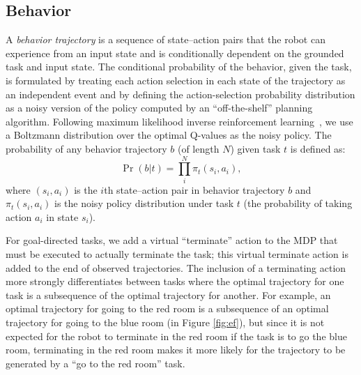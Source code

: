 \documentclass[conference]{IEEEtran}
\begin{document}
\subsection{Behavior}
A \emph{behavior trajectory} is a sequence of state--action pairs that the robot can experience from an input state and is conditionally dependent on the grounded task and input state. The conditional probability of the behavior, given the task, is formulated by treating each action selection in each state of the trajectory as an independent event and by defining the action-selection probability distribution as a noisy version of the policy computed by an ``off-the-shelf'' planning algorithm. Following maximum likelihood inverse reinforcement learning~\cite{babes11}, we use a Boltzmann distribution over the optimal Q-values as the noisy policy. The probability of any behavior trajectory $b$ (of length $N$) given task $t$ is defined as:
\begin{equation}
\label{eq:trajProb}
\Pr(b | t) = \prod^N_i \pi_t(s_i, a_i), 
\end{equation}
where $(s_i, a_i)$ is the $i$th state--action pair in behavior trajectory $b$ and $\pi_t(s_i, a_i)$ is the noisy policy distribution under task $t$ (the probability of taking action $a_i$ in state $s_i$).


For goal-directed tasks, we add a virtual ``terminate'' action to the MDP that must be executed to actually terminate the task; this virtual terminate action is added to the end of observed trajectories. The inclusion of a terminating action more strongly differentiates between tasks where the optimal trajectory for one task is a subsequence of the optimal trajectory for another. For example, an optimal trajectory for going to the red room is a subsequence of an optimal trajectory for going to the blue room (in Figure \ref{fig:ef}), but since it is not expected for the robot to terminate in the red room if the task is to go the blue room, terminating in the red room makes it more likely for the trajectory to be generated by a ``go to the red room'' task.
\end{document}
